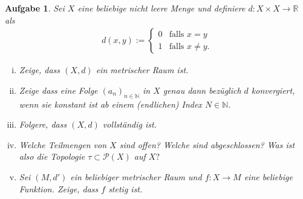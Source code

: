 \documentclass[a4paper, 20]{exam}
\newtheorem{ex}{Aufgabe}
\begin{document}
\begin{ex} Sei $X$ eine beliebige nicht leere Menge und definiere $d: X \times X \to \mathbb{R}$ als 
\begin{align*}
d(x,y):= \begin{cases} 0 & \text{falls } x=y \\ 1 & \text{falls } x \neq y. \end{cases}
\end{align*}
\begin{enumerate}[i)]
\item Zeige, dass $(X,d)$ ein metrischer Raum ist.
\item Zeige dass eine Folge $(a_n)_{n \in \mathbb{N}}$ in $X$ genau dann bezüglich $d$ konvergiert, wenn sie konstant ist ab einem (endlichen) Index $N \in \mathbb{N}$.
\item Folgere, dass $(X,d)$ vollständig ist.
\item Welche Teilmengen von $X$ sind offen? Welche sind abgeschlossen? Was ist also die Topologie $\tau \subset \mathcal{P}(X)$ auf $X?$
\item Sei $(M,d')$ ein beliebiger metrischer Raum und $f:X \to M$ eine beliebige Funktion. Zeige, dass $f$ stetig ist.
\end{enumerate}
\end{ex}
\end{document}
